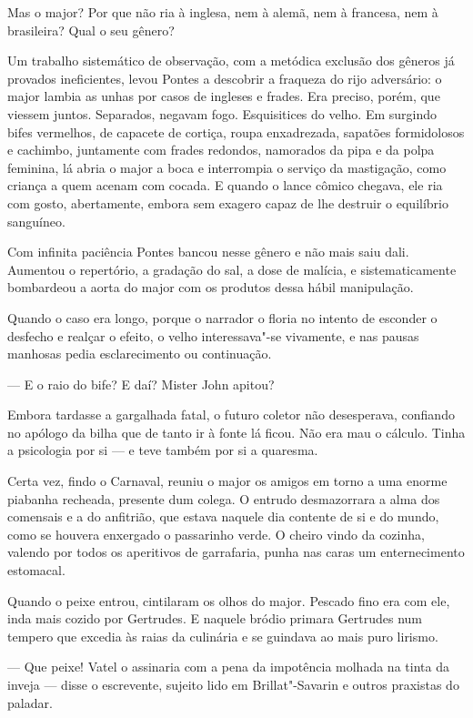 Mas o major? Por que não ria à inglesa, nem à alemã, nem à francesa, nem
à brasileira? Qual o seu gênero?

Um trabalho sistemático de observação, com a metódica exclusão dos
gêneros já provados ineficientes, levou Pontes a descobrir a fraqueza do
rijo adversário: o major lambia as unhas por casos de ingleses e frades.
Era preciso, porém, que viessem juntos. Separados, negavam fogo.
Esquisitices do velho. Em surgindo bifes vermelhos, de capacete de
cortiça, roupa enxadrezada, sapatões formidolosos e cachimbo, juntamente
com frades redondos, namorados da pipa e da polpa feminina, lá abria o
major a boca e interrompia o serviço da mastigação, como criança a quem
acenam com cocada. E quando o lance cômico chegava, ele ria com gosto,
abertamente, embora sem exagero capaz de lhe destruir o equilíbrio
sanguíneo.

Com infinita paciência Pontes bancou nesse gênero e não mais saiu dali.
Aumentou o repertório, a gradação do sal, a dose de malícia, e
sistematicamente bombardeou a aorta do major com os produtos dessa hábil
manipulação.

Quando o caso era longo, porque o narrador o floria no intento de
esconder o desfecho e realçar o efeito, o velho interessava"-se
vivamente, e nas pausas manhosas pedia esclarecimento ou continuação.

--- E o raio do bife? E daí? Mister John apitou?

Embora tardasse a gargalhada fatal, o futuro coletor não desesperava,
confiando no apólogo da bilha que de tanto ir à fonte lá ficou. Não era
mau o cálculo. Tinha a psicologia por si --- e teve também por si a
quaresma.

Certa vez, findo o Carnaval, reuniu o major os amigos em torno a uma
enorme piabanha recheada, presente dum colega. O entrudo desmazorrara a
alma dos comensais e a do anfitrião, que estava naquele dia contente de
si e do mundo, como se houvera enxergado o passarinho verde. O cheiro
vindo da cozinha, valendo por todos os aperitivos de garrafaria, punha
nas caras um enternecimento estomacal.

Quando o peixe entrou, cintilaram os olhos do major. Pescado fino era
com ele, inda mais cozido por Gertrudes. E naquele bródio primara
Gertrudes num tempero que excedia às raias da culinária e se guindava ao
mais puro lirismo.

--- Que peixe! Vatel o assinaria com a pena da impotência molhada na
tinta da inveja --- disse o escrevente, sujeito lido em Brillat"-Savarin
e outros praxistas do paladar.


